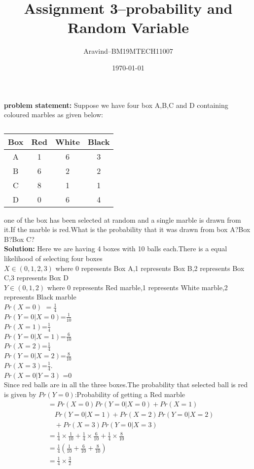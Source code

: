 \documentclass[11pt,a4paper,twocolumn]{article}
\title{\textbf{Assignment 3--probability and Random Variable}}
\author{Aravind--BM19MTECH11007}
\date{\today}
\begin{document}
\maketitle
\textbf{problem statement:} Suppose we have four box A,B,C and D containing coloured marbles as given below:
\begin{table}[h]
\centering
\caption{}

\begin{tabular}{|c|c|c|c|}
\hline
Box & Red & White & Black\\
\hline
A & 1&6&3\\
B&6&2&2\\
C&8&1&1\\
D&0&6&4\\
\hline
\end{tabular}
\end{table}
one of the box has been selected at random and a single marble is drawn from it.If the marble is red.What is the probability that it was drawn from box A?Box B?Box C?
\\
\textbf{Solution:}
Here we are having 4 boxes with 10 balls each.There is a equal likelihood of selecting  four boxes\\
$X\in(0,1,2,3)$ where 0 represents Box A,1 represents Box B,2 represents Box C,3 represents Box D\\
$Y\in(0,1,2)$ where 0 represents Red marble,1 represents White marble,2 represents Black marble\\
$Pr(X\!=\!0)$ $=\frac{1}{4}$
\\
$Pr(Y\!=\!0|X\!=\!0)$=$\frac{1}{10}$\\
$Pr(X\!=\!1)$=$\frac{1}{4}$
\\$Pr(Y\!=\!0|X\!=\!1)$=$\frac{6}{10}$\\
$Pr(X\!=\!2)$=$\frac{1}{4}$
\\$Pr(Y\!=\!0|X\!=\!2)$=$\frac{8}{10}$\\
$Pr(X\!=\!3)$=$\frac{1}{4}$.\\
$Pr(X\!=\!0|Y\!=\!3)$ =0\\
Since red balls are in all the three boxes.The probability that selected ball is red is given by
$Pr(Y=0)$:Probability of getting a Red marble
\begin{align*}
&=Pr(X=0)Pr(Y=0|X=0)+Pr(X=1)\\
& \quad Pr(Y=0|X=1)+Pr(X=2)Pr(Y=0|X=2)\\
& \quad+Pr(X=3)Pr(Y=0|X=3)\\
&=\frac{1}{4}\times\frac{1}{10}+\frac{1}{4}\times\frac{6}{10}+\frac{1}{4}\times\frac{8}{10}\\
&=\frac{1}{4}(\frac{1}{10}+\frac{6}{10}+\frac{8}{10})\\
&=\frac{1}{4}\times\frac{3}{2}
\end{align*}
\end{document}
